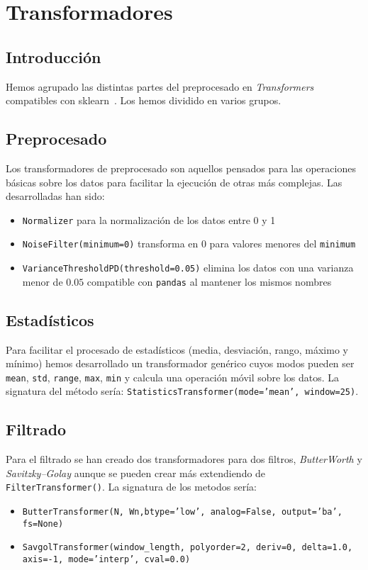 \documentclass[a4paper,12pt,twoside,oldfontcommands]{memoir}
\begin{document}
	\chapter{Transformadores}
	\section{Introducción}
	Hemos agrupado las distintas partes del preprocesado en \textit{Transformers} compatibles con sklearn~\cite{dreisbach_2015}. Los hemos dividido en varios grupos.
	\section{Preprocesado}
	Los transformadores de preprocesado son aquellos pensados para las operaciones básicas sobre los datos para facilitar la ejecución de otras más complejas. Las desarrolladas han sido:
	\begin{itemize}
		\item \texttt{Normalizer} para la normalización de los datos entre 0 y 1
		\item \texttt{NoiseFilter(minimum=0)} transforma en 0 para valores menores del \texttt{minimum}
		\item \texttt{VarianceThresholdPD(threshold=0.05)} elimina los datos con una varianza menor de \(0.05\) compatible con \texttt{pandas} al mantener los mismos nombres
	\end{itemize}
	\section{Estadísticos}
	Para facilitar el procesado de estadísticos (media, desviación, rango, máximo y mínimo) hemos desarrollado un transformador genérico cuyos modos pueden ser \texttt{mean}, \texttt{std}, \texttt{range}, \texttt{max}, \texttt{min} y calcula una operación móvil sobre los datos. La signatura del método sería: \texttt{StatisticsTransformer(mode='mean', window=25)}.
	\section{Filtrado}
	Para el filtrado se han creado dos transformadores para dos filtros, \textit{ButterWorth} y \textit{Savitzky–Golay} aunque se pueden crear más extendiendo de \texttt{FilterTransformer()}. La signatura de los metodos sería:
	\begin{itemize}
		\item \texttt{ButterTransformer(N, Wn,btype='low', analog=False, output='ba', fs=None)}
		\item \texttt{SavgolTransformer(window\_length, polyorder=2, deriv=0, delta=1.0, axis=-1, mode='interp', cval=0.0)}
	\end{itemize}
\end{document}

